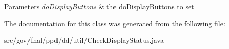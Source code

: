\begin{DoxyParams}{Parameters}
{\em do\-Display\-Buttons} & the do\-Display\-Buttons to set \\
\hline
\end{DoxyParams}


The documentation for this class was generated from the following file\-:\begin{DoxyCompactItemize}
\item 
src/gov/fnal/ppd/dd/util/Check\-Display\-Status.\-java\end{DoxyCompactItemize}
